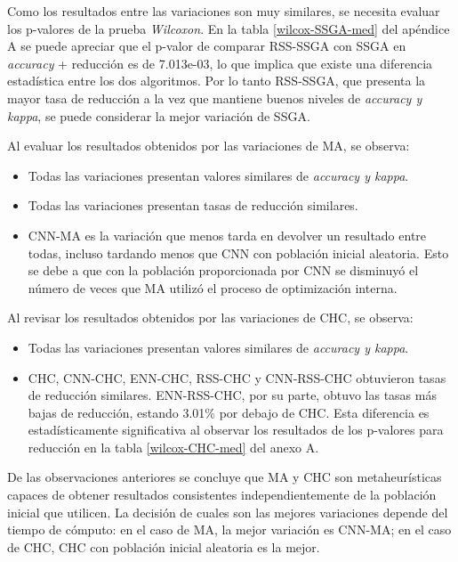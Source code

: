 Como los resultados entre las variaciones son muy similares, se necesita evaluar los p-valores de la prueba \emph{Wilcoxon}. En la tabla \ref{wilcox-SSGA-med} del apéndice A se puede apreciar que el p-valor de comparar RSS-SSGA con SSGA en \emph{accuracy} + reducción es de 7.013e-03, lo que implica que existe una diferencia estadística entre los dos algoritmos. Por lo tanto RSS-SSGA, que presenta la mayor tasa de reducción a la vez que mantiene buenos niveles de \emph{accuracy y kappa}, se puede considerar la mejor variación de SSGA.

Al evaluar los resultados obtenidos por las variaciones de MA, se observa:

\begin{itemize}

\item Todas las variaciones presentan valores similares de \emph{accuracy y kappa}.

\item Todas las variaciones presentan tasas de reducción similares.

\item CNN-MA es la variación que menos tarda en devolver un resultado entre todas, incluso tardando menos que CNN con población inicial aleatoria. Esto se debe a que con la población proporcionada por CNN se disminuyó el número de veces que MA utilizó el proceso de optimización interna.

\end{itemize}

Al revisar los resultados obtenidos por las variaciones de CHC, se observa:

\begin{itemize}

\item Todas las variaciones presentan valores similares de \emph{accuracy y kappa}.

\item CHC, CNN-CHC, ENN-CHC, RSS-CHC y CNN-RSS-CHC obtuvieron tasas de reducción similares. ENN-RSS-CHC, por su parte, obtuvo las tasas más bajas de reducción, estando 3.01\% por debajo de CHC. Esta diferencia es estadísticamente significativa al observar los resultados de los p-valores para reducción en la tabla \ref{wilcox-CHC-med} del anexo A.

\end{itemize}

De las observaciones anteriores se concluye que MA y CHC son metaheurísticas capaces de obtener resultados consistentes independientemente de la población inicial que utilicen. La decisión de cuales son las mejores variaciones depende del tiempo de cómputo: en el caso de MA, la mejor variación es CNN-MA; en el caso de CHC, CHC con población inicial aleatoria es la mejor.


